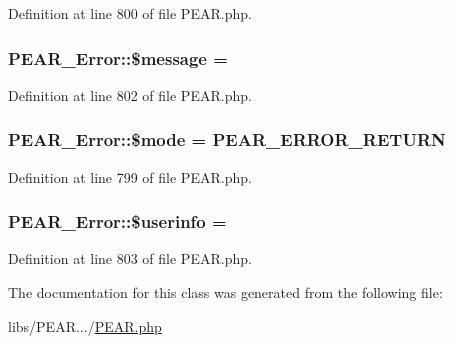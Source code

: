 Definition at line 800 of file P\+E\+A\+R.\+php.

\hypertarget{classPEAR__Error_a21cd38ff638a63b3d6506d994bc488df}{}
\subsubsection[{\$message}]{\setlength{\rightskip}{0pt plus 5cm}P\+E\+A\+R\+\_\+\+Error\+::\$message = \textquotesingle{}\textquotesingle{}}\label{classPEAR__Error_a21cd38ff638a63b3d6506d994bc488df}


Definition at line 802 of file P\+E\+A\+R.\+php.

\hypertarget{classPEAR__Error_a37fd8f51c6a1a0df165b7e36c88fbea7}{}
\subsubsection[{\$mode}]{\setlength{\rightskip}{0pt plus 5cm}P\+E\+A\+R\+\_\+\+Error\+::\$mode = {\bf P\+E\+A\+R\+\_\+\+E\+R\+R\+O\+R\+\_\+\+R\+E\+T\+U\+R\+N}}\label{classPEAR__Error_a37fd8f51c6a1a0df165b7e36c88fbea7}


Definition at line 799 of file P\+E\+A\+R.\+php.

\hypertarget{classPEAR__Error_ad201e08b4f3faace7a729ccf2744fdee}{}
\subsubsection[{\$userinfo}]{\setlength{\rightskip}{0pt plus 5cm}P\+E\+A\+R\+\_\+\+Error\+::\$userinfo = \textquotesingle{}\textquotesingle{}}\label{classPEAR__Error_ad201e08b4f3faace7a729ccf2744fdee}


Definition at line 803 of file P\+E\+A\+R.\+php.



The documentation for this class was generated from the following file\+:\begin{DoxyCompactItemize}
\item 
libs/\+P\+E\+A\+R.../\hyperlink{PEAR_8php}{P\+E\+A\+R.\+php}\end{DoxyCompactItemize}

